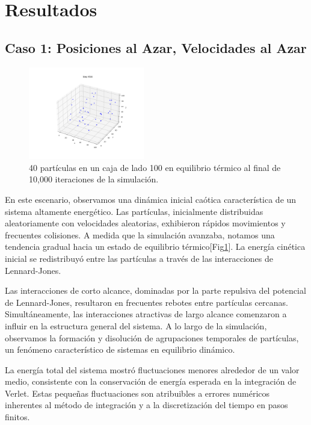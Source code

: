 \documentclass[twocolumn]{article}
\begin{document}
\section{Resultados}

\subsection*{Caso 1: Posiciones al Azar, Velocidades al Azar}

\begin{figure}[h]
    \centering
    \includegraphics[width=0.45\textwidth]{figures/40p_10ki_11.png}
    \caption{40 partículas en un caja de lado 100 en equilibrio térmico al final de 10,000 iteraciones de la simulación.}
    \label{fig:case1_equilibrio}
\end{figure}

En este escenario, observamos una dinámica inicial caótica característica de un sistema altamente energético. Las partículas, inicialmente distribuidas aleatoriamente con velocidades aleatorias, exhibieron rápidos movimientos y frecuentes colisiones. A medida que la simulación avanzaba, notamos una tendencia gradual hacia un estado de equilibrio térmico[Fig\ref{fig:case1_equilibrio}]. La energía cinética inicial se redistribuyó entre las partículas a través de las interacciones de Lennard-Jones.

Las interacciones de corto alcance, dominadas por la parte repulsiva del potencial de Lennard-Jones, resultaron en frecuentes rebotes entre partículas cercanas. Simultáneamente, las interacciones atractivas de largo alcance comenzaron a influir en la estructura general del sistema. A lo largo de la simulación, observamos la formación y disolución de agrupaciones temporales de partículas, un fenómeno característico de sistemas en equilibrio dinámico.

La energía total del sistema mostró fluctuaciones menores alrededor de un valor medio, consistente con la conservación de energía esperada en la integración de Verlet. Estas pequeñas fluctuaciones son atribuibles a errores numéricos inherentes al método de integración y a la discretización del tiempo en pasos finitos.
\end{document}
